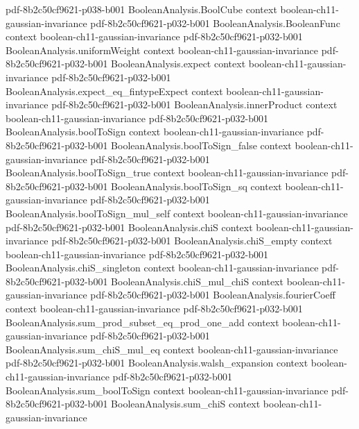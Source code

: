 \begin{theorem}
  {pdf-8b2c50cf9621-p038-b001}
\proofstep
  {BooleanAnalysis.BoolCube}
  {context}
  {boolean-ch11-gaussian-invariance}
  {pdf-8b2c50cf9621-p032-b001}
\proofstep
  {BooleanAnalysis.BooleanFunc}
  {context}
  {boolean-ch11-gaussian-invariance}
  {pdf-8b2c50cf9621-p032-b001}
\proofstep
  {BooleanAnalysis.uniformWeight}
  {context}
  {boolean-ch11-gaussian-invariance}
  {pdf-8b2c50cf9621-p032-b001}
\proofstep
  {BooleanAnalysis.expect}
  {context}
  {boolean-ch11-gaussian-invariance}
  {pdf-8b2c50cf9621-p032-b001}
\proofstep
  {BooleanAnalysis.expect_eq_fintypeExpect}
  {context}
  {boolean-ch11-gaussian-invariance}
  {pdf-8b2c50cf9621-p032-b001}
\proofstep
  {BooleanAnalysis.innerProduct}
  {context}
  {boolean-ch11-gaussian-invariance}
  {pdf-8b2c50cf9621-p032-b001}
\proofstep
  {BooleanAnalysis.boolToSign}
  {context}
  {boolean-ch11-gaussian-invariance}
  {pdf-8b2c50cf9621-p032-b001}
\proofstep
  {BooleanAnalysis.boolToSign_false}
  {context}
  {boolean-ch11-gaussian-invariance}
  {pdf-8b2c50cf9621-p032-b001}
\proofstep
  {BooleanAnalysis.boolToSign_true}
  {context}
  {boolean-ch11-gaussian-invariance}
  {pdf-8b2c50cf9621-p032-b001}
\proofstep
  {BooleanAnalysis.boolToSign_sq}
  {context}
  {boolean-ch11-gaussian-invariance}
  {pdf-8b2c50cf9621-p032-b001}
\proofstep
  {BooleanAnalysis.boolToSign_mul_self}
  {context}
  {boolean-ch11-gaussian-invariance}
  {pdf-8b2c50cf9621-p032-b001}
\proofstep
  {BooleanAnalysis.chiS}
  {context}
  {boolean-ch11-gaussian-invariance}
  {pdf-8b2c50cf9621-p032-b001}
\proofstep
  {BooleanAnalysis.chiS_empty}
  {context}
  {boolean-ch11-gaussian-invariance}
  {pdf-8b2c50cf9621-p032-b001}
\proofstep
  {BooleanAnalysis.chiS_singleton}
  {context}
  {boolean-ch11-gaussian-invariance}
  {pdf-8b2c50cf9621-p032-b001}
\proofstep
  {BooleanAnalysis.chiS_mul_chiS}
  {context}
  {boolean-ch11-gaussian-invariance}
  {pdf-8b2c50cf9621-p032-b001}
\proofstep
  {BooleanAnalysis.fourierCoeff}
  {context}
  {boolean-ch11-gaussian-invariance}
  {pdf-8b2c50cf9621-p032-b001}
\proofstep
  {BooleanAnalysis.sum_prod_subset_eq_prod_one_add}
  {context}
  {boolean-ch11-gaussian-invariance}
  {pdf-8b2c50cf9621-p032-b001}
\proofstep
  {BooleanAnalysis.sum_chiS_mul_eq}
  {context}
  {boolean-ch11-gaussian-invariance}
  {pdf-8b2c50cf9621-p032-b001}
\proofstep
  {BooleanAnalysis.walsh_expansion}
  {context}
  {boolean-ch11-gaussian-invariance}
  {pdf-8b2c50cf9621-p032-b001}
\proofstep
  {BooleanAnalysis.sum_boolToSign}
  {context}
  {boolean-ch11-gaussian-invariance}
  {pdf-8b2c50cf9621-p032-b001}
\proofstep
  {BooleanAnalysis.sum_chiS}
  {context}
  {boolean-ch11-gaussian-invariance}

\end{theorem}
